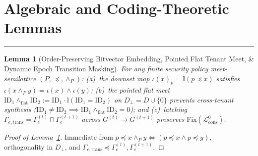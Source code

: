\documentclass[10pt,twocolumn]{article}
\makeatletter
\newif\ifspecintwocol \specintwocolfalse
\newif\ifspecresume   \specresumefalse
\newcommand{\StopTwoCol}{%
  \if@twocolumn
    \onecolumn
    \global\specintwocolfalse
    \let\spec@next\@empty
  \else
    \ifspecintwocol
      \global\specintwocolfalse
      \def\spec@next{\end{multicols}}%
    \else
      \let\spec@next\@empty
    \fi
  \fi
  \spec@next
}
\newcommand{\BeginConnesPlate}{%
  \if@twocolumn
    \onecolumn
    \global\specresumetrue
    \let\spec@platepre\@empty
  \else
    \ifspecintwocol
      \global\specresumetrue
      \let\spec@platepre\StopTwoCol
    \else
      \global\specresumefalse
      \let\spec@platepre\@empty
    \fi
  \fi
  \spec@platepre
  \par\vspace{4pt}\noindent\textcolor{black!25}{\rule{\textwidth}{0.4pt}}\par\vspace{3pt}%
}
\theoremstyle{spectralthm}
\newtheorem{lemma}[theorem]{Lemma}
\makeatother
\begin{document}
\StopTwoCol
\clearpage

\appendix
\section{Algebraic and Coding-Theoretic Lemmas}
\label{sec:appendix}

\BeginConnesPlate
\begin{lemma}[Order-Preserving Bitvector Embedding, Pointed Flat Tenant Meet, \& Dynamic Epoch Transition Masking]
\label{lem:embedding}
For any finite security policy meet-semilattice $(P, \preceq, \wedge_P)$: (a)~the downset map $\iota(x)_p = \mathbb{I}(p \preceq x)$ satisfies $\iota(x \wedge_P y) = \iota(x) \wedge \iota(y)$; (b)~the pointed flat meet $\mathrm{ID}_1 \wedge_{\mathrm{flat}} \mathrm{ID}_2 := \mathrm{ID}_1 \cdot \mathbb{I}(\mathrm{ID}_1 = \mathrm{ID}_2)$ on $D_\perp = D \cup \{0\}$ prevents cross-tenant synthesis ($\mathrm{ID}_1 \neq \mathrm{ID}_2 \implies \mathrm{ID}_1 \wedge_{\mathrm{flat}} \mathrm{ID}_2 = 0$); and (c)~latching $\Gamma_{e,\mathrm{trans}} = \Gamma_e^{(t)} \sqcap \Gamma_e^{(t+1)}$ across $G^{(t)} \rightarrow G^{(t+1)}$ preserves $\mathrm{Fix}(\mathcal{L}_{\mathrm{cons}}^0)$.
\end{lemma}
\begin{proof}[Proof of Lemma~\ref{lem:embedding}]
Immediate from $p \preceq x \wedge_P y \iff (p \preceq x \wedge p \preceq y)$, orthogonality in $D_\perp$, and $\Gamma_{e,\mathrm{trans}} \preceq \Gamma_e^{(t)}, \Gamma_e^{(t+1)}$.
\end{proof}
\end{document}
